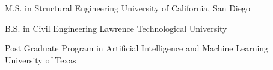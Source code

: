 \documentclass{leresume}
\begin{document}
                {M.S. in Structural Engineering}
                {University of California, San Diego}
		
                {B.S. in Civil Engineering}
                {Lawrence Technological University}
		
                {Post Graduate Program in Artificial Intelligence and Machine Learning}
                {University of Texas}
		

    
    
    
    
    
    
    
    
	
	
    
    
    
    
\end{document}
